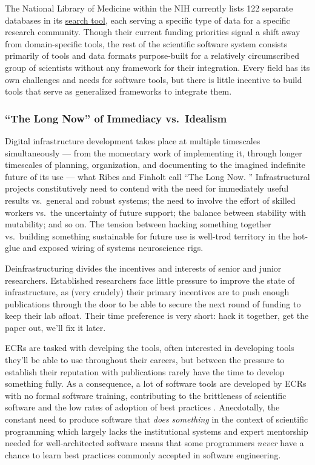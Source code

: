 \documentclass[11pt]{article}
\begin{document}
\begin{multicols}{2}
The National Library of Medicine within the NIH currently lists 122
separate databases in its
\href{https://eresources.nlm.nih.gov/nlm_eresources/}{search tool}, each
serving a specific type of data for a specific research community.
Though their current funding priorities signal a shift away from
domain-specific tools, the rest of the scientific software system
consists primarily of tools and data formats purpose-built for a
relatively circumscribed group of scientists without any framework for
their integration. Every field has its own challenges and needs for
software tools, but there is little incentive to build tools that serve
as generalized frameworks to integrate them.

\hypertarget{the-long-now-of-immediacy-vs.-idealism}{%
\subsubsection{``The Long Now'' of Immediacy
vs.~Idealism}\label{the-long-now-of-immediacy-vs.-idealism}}

Digital infrastructure development takes place at multiple timescales
simultaneously --- from the momentary work of implementing it, through
longer timescales of planning, organization, and documenting to the
imagined indefinite future of its use --- what Ribes and Finholt call
``The Long Now. \cite{ribesLongNowTechnology2009} ''
Infrastructural projects constitutively need to contend with the need
for immediately useful results vs.~general and robust systems; the need
to involve the effort of skilled workers vs.~the uncertainty of future
support; the balance between stability with mutability; and so on. The
tension between hacking something together vs.~building something
sustainable for future use is well-trod territory in the hot-glue and
exposed wiring of systems neuroscience rigs.

Deinfrastructuring divides the incentives and interests of senior and
junior researchers. Established researchers face little pressure to
improve the state of infrastructure, as (very crudely) their primary
incentives are to push enough publications through the door to be able
to secure the next round of funding to keep their lab afloat. Their time
preference is very short: hack it together, get the paper out, we'll fix
it later.

ECRs are tasked with develping the tools, often interested in developing
tools they'll be able to use throughout their careers, but between the
pressure to establish their reputation with publications rarely have the
time to develop something fully. As a consequence, a lot of software
tools are developed by ECRs with no formal software training,
contributing to the brittleness of scientific software and the low rates
of adoption of best practices \cite{altschulAnatomySuccessfulComputational2013} . Anecdotally, the
constant need to produce software that \emph{does something} in the
context of scientific programming which largely lacks the institutional
systems and expert mentorship needed for well-architected software means
that some programmers \emph{never} have a chance to learn best practices
commonly accepted in software engineering.


\end{multicols}
\end{document}
